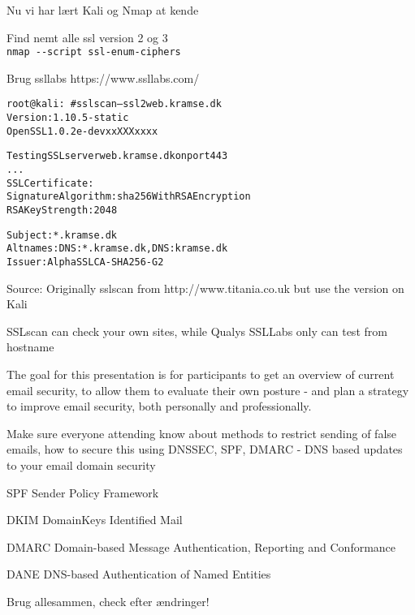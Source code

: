 \documentclass[Screen16to9,17pt]{foils}
\begin{document}
\begin{list1}
\item Nu vi har lært Kali og Nmap at kende
\begin{list2}
\item Find nemt alle ssl version 2 og 3\\
\verb+nmap --script ssl-enum-ciphers+
\item Brug ssllabs https://www.ssllabs.com/
\end{list2}
\end{list1}



\begin{alltt}\small
root@kali:~# sslscan --ssl2 web.kramse.dk
Version: 1.10.5-static
OpenSSL 1.0.2e-dev xx XXX xxxx

Testing SSL server web.kramse.dk on port 443
...
  SSL Certificate:
Signature Algorithm: sha256WithRSAEncryption
RSA Key Strength:    2048

Subject:  *.kramse.dk
Altnames: DNS:*.kramse.dk, DNS:kramse.dk
Issuer:   AlphaSSL CA - SHA256 - G2
\end{alltt}

Source:
Originally sslscan from http://www.titania.co.uk
 but use the version on Kali

SSLscan can check your own sites, while Qualys SSLLabs only can test from hostname



The goal for this presentation is for participants to get an overview of current email security, to allow them to evaluate their own posture - and plan a strategy to improve email security, both personally and professionally.

Make sure everyone attending know about methods to restrict sending of false
emails, how to secure this using DNSSEC, SPF, DMARC - DNS based updates to your
email domain security




\begin{list2}
\item SPF Sender Policy Framework\\ {\footnotesize{}}
\item DKIM DomainKeys Identified Mail\\
{\footnotesize{}}
\item DMARC Domain-based Message Authentication, Reporting and Conformance\\
{\footnotesize{}}
\item DANE DNS-based Authentication of Named Entities\\ {\footnotesize{}}
\item Brug allesammen, check efter ændringer!
\end{list2}
\end{document}
